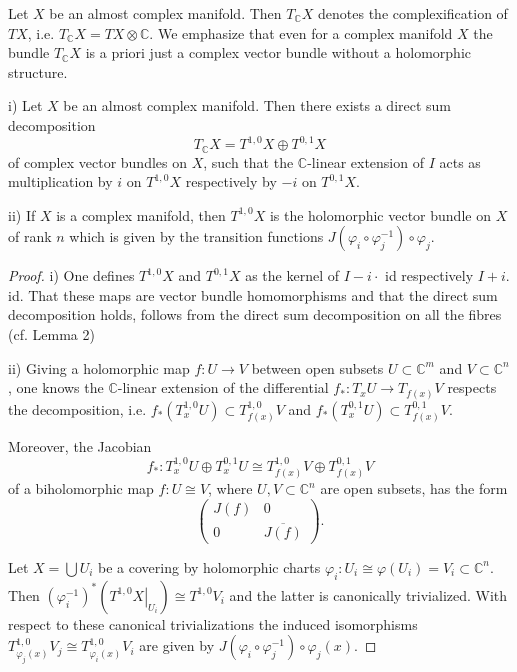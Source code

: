 \documentclass{ctexart}
\begin{document}
Let $X$ be an almost complex manifold. Then $T_{\mathbb{C}} X$ denotes the complexification of $T X$, i.e. $T_{\mathbb{C}} X=T X \otimes \mathbb{C}$. 
We emphasize that even for a complex manifold $X$ the bundle $T_{\mathbb{C}} X$ is a priori just a complex vector bundle without a holomorphic structure.
\begin{proposition}
  i) Let $X$ be an almost complex manifold. Then there exists a direct sum decomposition
  $$
  T_{\mathbb{C}} X=T^{1,0} X \oplus T^{0,1} X
  $$
  of complex vector bundles on $X$, such that the $\mathbb{C}$-linear extension of $I$ acts as multiplication by $i$ on $T^{1,0} X$ respectively by $-i$ on $T^{0,1} X$.

  ii) If $X$ is a complex manifold, then $T^{1,0} X$ is the holomorphic vector bundle on $X$ of rank $n$ which is 
  given by the transition functions $J\left(\varphi_i \circ \varphi_j^{-1}\right) \circ \varphi_j$.
\end{proposition}
\begin{proof}[Proof]
  i) One defines $T^{1,0} X$ and $T^{0,1} X$ as the kernel of $I-i \cdot$ id respectively $I+i$. id. That these maps are vector bundle homomorphisms and that 
  the direct sum decomposition holds, follows from the direct sum decomposition on all the fibres (cf. Lemma 2)
  
  ii) Giving a holomorphic map $f: U \rightarrow V$ between open subsets $U \subset \mathbb{C}^m$ and $V \subset \mathbb{C}^n$, one knows the $\mathbb{C}$-linear extension 
  of the differential $f_*: T_x U \rightarrow T_{f(x)} V$ respects the decomposition, 
  i.e. $f_*\left(T_x^{1,0} U\right) \subset T_{f(x)}^{1,0} V$ and $f_*\left(T_x^{0,1} U\right) \subset T_{f(x)}^{0,1} V$. 

  Moreover, the Jacobian
  $$
  f_*: T_x^{1,0} U \oplus T_x^{0,1} U \cong T_{f(x)}^{1,0} V \oplus T_{f(x)}^{0,1} V
  $$
  of a biholomorphic map $f: U \cong V$, where $U, V \subset \mathbb{C}^n$ are open subsets, has the form 
  $$
  \left(\begin{array}{cc}J(f) & 0 \\ 0 & \overline{J(f)}\end{array}\right).
  $$

  Let $X=\bigcup U_i$ be a covering by holomorphic charts $\varphi_i: U_i \cong \varphi\left(U_i\right)=V_i\subset\mathbb{C}^n$. 
  Then $\left(\varphi_i^{-1}\right)^*\left(\left.T^{1,0} X\right|_{U_i}\right) \cong T^{1,0} V_i$ and the latter is canonically trivialized. 
  With respect to these canonical trivializations the induced isomorphisms $T_{\varphi_j(x)}^{1,0} V_j \cong T_{\varphi_i(x)}^{1,0} V_i$ are given by 
  $J\left(\varphi_i \circ \varphi_j^{-1}\right) \circ \varphi_j(x)$. 
\end{proof}
\end{document}
